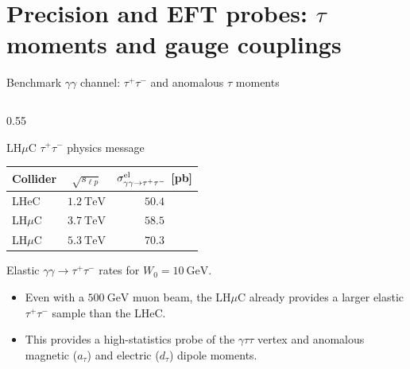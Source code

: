 \documentclass[aspectratio=1610,english]{beamer}
\begin{document}
\section{Precision and EFT probes: $\tau$ moments and gauge couplings}




\begin{frame}{Benchmark \(\gamma\gamma\) channel: \(\tau^+\tau^-\) and anomalous \(\tau\) moments}
	
\begin{columns}[T]%
		
\begin{column}{0.55\textwidth}
			
{
				
\begin{beamerboxesrounded}[upper=uppercol,lower=lowercol,shadow=true]{LH$\mu$C $\tau^+\tau^-$ physics message}

\begin{center}
\tiny 
\begin{tabular}{lcc}
\hline
\textbf{Collider} &
\textbf{$\sqrt{s_{\ell p}}$} &
\textbf{$\sigma^{\rm el}_{\gamma\gamma\to\tau^+\tau^-}$ [pb]} \\
\hline
LHeC      & $1.2~\mathrm{TeV}$ & $50.4$ \\
LH$\mu$C  & $3.7~\mathrm{TeV}$ & $58.5$ \\
LH$\mu$C  & $5.3~\mathrm{TeV}$ & $70.3$ \\
\hline
\end{tabular}

\tiny \centering Elastic $\gamma\gamma\to\tau^+\tau^-$ rates for $W_0=10~\mathrm{GeV}$.\par
\end{center}

\begin{itemize}
\footnotesize \justifying
\item Even with a $500~\mathrm{GeV}$ muon beam, the LH$\mu$C already provides a larger elastic $\tau^+\tau^-$ sample than the LHeC.

\item This provides a high-statistics probe of the \(\gamma\tau\tau\) vertex and anomalous magnetic ($a_\tau$) and electric ($d_\tau$) dipole moments.


\end{itemize}
\end{beamerboxesrounded}}
\end{column}
\end{columns}
\end{frame}
\end{document}
